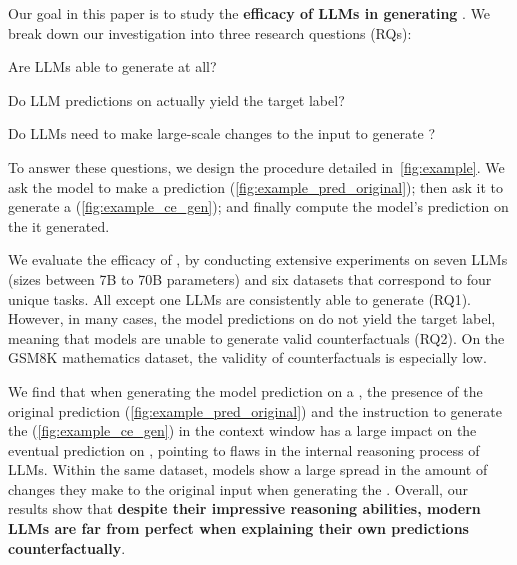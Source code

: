 Our goal in this paper is to study the \textbf{efficacy of LLMs in  generating \SCEs}. We break down our investigation into three research questions (RQs):

\begin{description}
    \setlength{\itemsep}{0em}
    \item [RQ1] Are LLMs able to generate \SCEs at all?
    \item [RQ2] Do LLM predictions on \SCEs actually yield the target label?
    \item [RQ3] Do LLMs need to make large-scale changes to the input to generate \SCEs?
\end{description}

\noindent
To answer these questions, we design the procedure detailed in~\autoref{fig:example}. We ask the model to make a prediction (\autoref{fig:example_pred_original}); then ask it to generate a \SCE (\autoref{fig:example_ce_gen}); and finally compute the model's prediction on the \SCE it generated.

We evaluate the efficacy of \SCEs,
by conducting extensive experiments on seven LLMs (sizes between 7B to 70B parameters) and six datasets that correspond to four unique tasks. 
All except one LLMs are consistently able to generate \SCEs (RQ1). However, in many cases, the model predictions on \SCEs do not yield the target label, meaning that models are unable to generate valid counterfactuals (RQ2). On the GSM8K mathematics dataset, the validity of counterfactuals is especially low.

We find that when generating the model prediction on a \SCE, the presence of the original prediction (\autoref{fig:example_pred_original}) and the instruction to generate the \SCE (\autoref{fig:example_ce_gen}) in the context window has a large impact on the eventual prediction on \SCE,  pointing to flaws in the internal reasoning process of LLMs. Within the same dataset, models show a large spread in the amount of changes they make to the original input when generating the \SCE.
Overall, our results show that \textbf{despite their impressive reasoning abilities, modern LLMs are far from perfect when explaining their own predictions counterfactually}.




